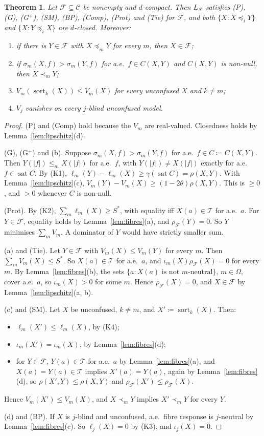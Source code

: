 \documentclass[11pt]{article}
\newcommand{\chg}[1]{{\color{red}#1}}
\newtheorem{theorem}{Theorem}[section]
\theoremstyle{definition}
\theoremstyle{remark}
\newcommand{\C}{\mathcal C}
\newcommand{\T}{\mathcal T}
\newcommand{\F}{\mathcal F}
\newcommand{\sat}{\operatorname{sat}}
\begin{document}
\begin{theorem}\label{thm:realisation}
Let $\F\subseteq\C$ be nonempty and $d$-compact. Then $L_\F$ satisfies (P), (G), (G$^+$), (SM), (BP), (Comp), (Prot) and (Tie) for $\F$, and both $\{X:X\preceq_iY\}$ and $\{X:Y\preceq_iX\}$ are $d$-closed. Moreover:
\begin{enumerate}[label=\textup{(\alph*)}]
\item \chg{if there is $Y\in\F$ with $X\preceq_mY$ for every $m$, then $X\in\F$};
\item \chg{if $\sigma_m(X,f)>\sigma_m(Y,f)$ for a.e.\ $f\in C(X,Y)$ and $C(X,Y)$ is non-null, then $X\prec_mY$};
\item $V_m(\operatorname{sort}_k(X))\le V_m(X)$ for every unconfused $X$ and $k\neq m$;
\item $V_j$ vanishes on every $j$-blind unconfused model.
\end{enumerate}
\end{theorem}
\begin{proof}
(P) and (Comp) hold because the $V_m$ are real-valued. Closedness holds by Lemma~\ref{lem:lipschitz}(d).

(G), (G$^+$) and (b). Suppose $\sigma_m(X,f)>\sigma_m(Y,f)$ for a.e.\ $f\in C\coloneqq C(X,Y)$. Then $Y(|f|)\le_mX(|f|)$ for a.e.\ $f$, \chg{with $Y(|f|)\neq X(|f|)$ exactly for a.e.\ $f\in\sat C$}. By (K1), $\ell_m(Y)-\ell_m(X)\ge\gamma(\sat C)=\rho(X,Y)$. With Lemma~\ref{lem:lipschitz}(c), $V_m(Y)-V_m(X)\ge(1-2\theta)\rho(X,Y)$. This is $\ge0$, and $>0$ whenever $C$ is non-null.

(Prot). By (K2), $\sum_m\ell_m(X)\ge S^\ast$, with equality iff $X(a)\in\T$ for a.e.\ $a$. For $Y\in\F$, equality holds by Lemma~\ref{lem:fibres}(a), and $\rho_\F(Y)=0$. So $Y$ minimises $\sum_mV_m$. A dominator of $Y$ would have strictly smaller sum.

(a) and (Tie). Let $Y\in\F$ with $V_m(X)\le V_m(Y)$ for every $m$. Then $\sum_mV_m(X)\le S^\ast$. So $X(a)\in\T$ for a.e.\ $a$, and $\iota_m(X)\rho_\F(X)=0$ for every $m$. By Lemma~\ref{lem:fibres}(b), the sets $\{a:X(a)\text{ is not $m$-neutral}\}$, $m\in\Omega$, cover a.e.\ $a$, so $\iota_m(X)>0$ for some $m$. Hence $\rho_\F(X)=0$, and $X\in\F$ by Lemma~\ref{lem:lipschitz}(a, b).

(c) and (SM). Let $X$ be unconfused, $k\neq m$, and $X'\coloneqq\operatorname{sort}_k(X)$. Then:
\begin{itemize}
\item $\ell_m(X')\le\ell_m(X)$, by (K4);
\item $\iota_m(X')=\iota_m(X)$, by Lemma~\ref{lem:fibres}(d);
\item for $Y\in\F$, \chg{$Y(a)\in\T$ for a.e.\ $a$ by Lemma~\ref{lem:fibres}(a), and} $X(a)=Y(a)\in\T$ implies $X'(a)=Y(a)$, again by Lemma~\ref{lem:fibres}(d), so $\rho(X',Y)\le\rho(X,Y)$ and $\rho_\F(X')\le\rho_\F(X)$.
\end{itemize}
Hence $V_m(X')\le V_m(X)$, and $X\prec_mY$ implies $X'\prec_mY$ for every $Y$.

(d) and (BP). If $X$ is $j$-blind and unconfused, a.e.\ fibre response is $j$-neutral by Lemma~\ref{lem:fibres}(c). So $\ell_j(X)=0$ by (K3), and $\iota_j(X)=0$.
\end{proof}
\end{document}
